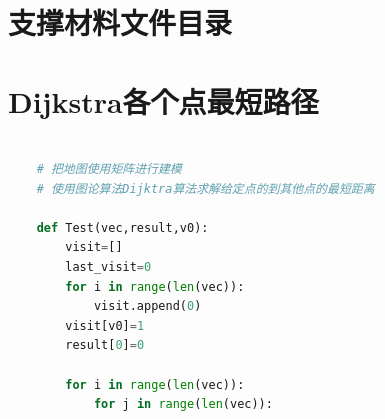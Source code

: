 \documentclass[withoutpreface,bwprint]{cumcmthesis} %
\begin{document}
\newpage
\begin{appendices}
\section{支撑材料文件目录}


















\section{Dijkstra各个点最短路径}
\begin{lstlisting}[language=python]

    # 把地图使用矩阵进行建模
    # 使用图论算法Dijktra算法求解给定点的到其他点的最短距离
    
    def Test(vec,result,v0):
        visit=[]
        last_visit=0
        for i in range(len(vec)):
            visit.append(0)
        visit[v0]=1
        result[0]=0
    
        for i in range(len(vec)):
            for j in range(len(vec)):
    

\end{lstlisting}
\end{appendices}
\end{document}

